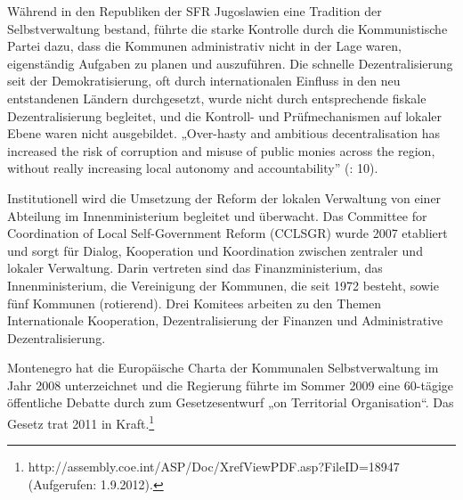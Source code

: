 Während in den Republiken der SFR Jugoslawien eine Tradition der Selbstverwaltung bestand, führte die starke Kontrolle durch die Kommunistische Partei dazu, dass die Kommunen administrativ nicht in der Lage waren, eigenständig Aufgaben zu planen und auszuführen. Die schnelle Dezentralisierung seit der Demokratisierung, oft durch internationalen Einfluss in den neu entstandenen Ländern durchgesetzt, wurde nicht durch entsprechende fiskale Dezentralisierung begleitet, und die Kontroll- und Prüfmechanismen auf lokaler Ebene waren nicht ausgebildet. „Over-hasty and ambitious decentralisation has increased the risk of corruption and misuse of public monies across the region, without really increasing local autonomy and accountability” (\cite{oecd04}: 10).\par
Institutionell wird die Umsetzung der Reform der lokalen Verwaltung von einer Abteilung im Innenministerium begleitet und überwacht. Das Committee for Coordination of Local Self-Government Reform (CCLSGR) wurde 2007 etabliert und sorgt für Dialog, Kooperation und Koordination zwischen zentraler und lokaler Verwaltung. Darin vertreten sind das Finanzministerium, das Innenministerium, die Vereinigung der Kommunen, die seit 1972 besteht, sowie fünf Kommunen (rotierend). Drei Komitees arbeiten zu den Themen Internationale Kooperation, Dezentralisierung der Finanzen und Administrative Dezentralisierung. \par
Montenegro hat die Europäische Charta der Kommunalen Selbstverwaltung im Jahr 2008 unterzeichnet und die Regierung führte im Sommer 2009 eine 60-tägige öffentliche Debatte durch zum Gesetzesentwurf „on Territorial Organisation“. Das Gesetz trat 2011 in Kraft.\footnote{http://assembly.coe.int/ASP/Doc/XrefViewPDF.asp?FileID=18947 (Aufgerufen: 1.9.2012).} 



